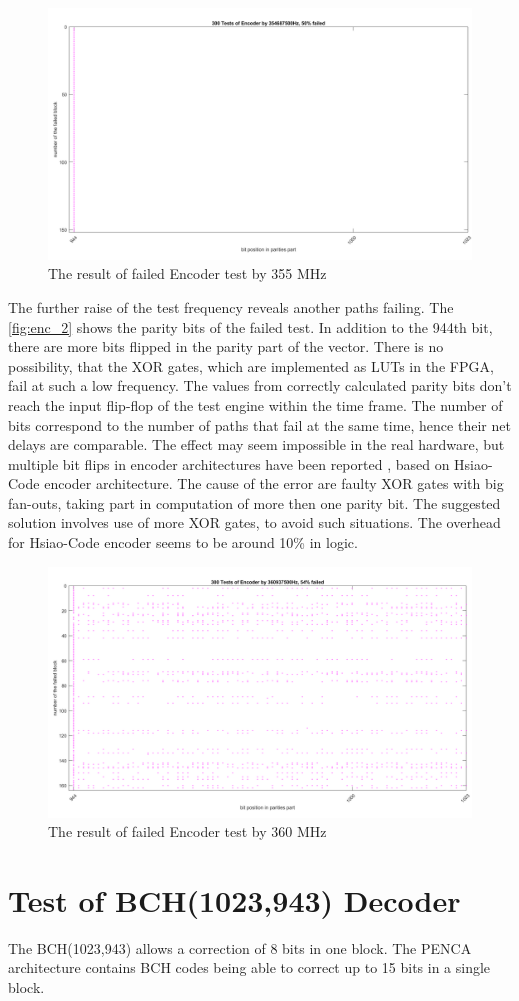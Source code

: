 \begin{figure}[h]
\centering
\includegraphics[width=\textwidth]{figures/test_ENC_1.png}
\caption{The result of failed Encoder test by 355 MHz}
\label{fig:enc_1}
\end{figure}

The further raise of the test frequency reveals another paths failing. The \autoref{fig:enc_2} shows the parity bits of the failed test. In addition to the 944th bit, there are more bits flipped in the parity part of the vector. There is no possibility, that the XOR gates, which are implemented as LUTs in the FPGA, fail at such a low frequency. The values from correctly calculated parity bits don't reach the input flip-flop of the test engine within the time frame. The number of bits correspond to the number of paths that fail at the same time, hence their net delays are comparable. The effect may seem impossible in the real hardware, but multiple bit flips in encoder architectures have been reported \cite{art:Dicorato}, based on Hsiao-Code encoder architecture. The cause of the error are faulty XOR gates with big fan-outs, taking part in computation of more then one parity bit. The suggested solution involves use of more XOR gates, to avoid such situations. The overhead for Hsiao-Code encoder seems to be around 10\% in logic.

\begin{figure}[h]
\centering
\includegraphics[width=\textwidth]{figures/test_ENC_multiple.png}
\caption{The result of failed Encoder test by 360 MHz}
\label{fig:enc_2}
\end{figure}

\section{Test of BCH(1023,943) Decoder}

The BCH(1023,943) allows a correction of 8 bits in one block. The PENCA architecture contains BCH codes being able to correct up to 15 bits in a single block. 
